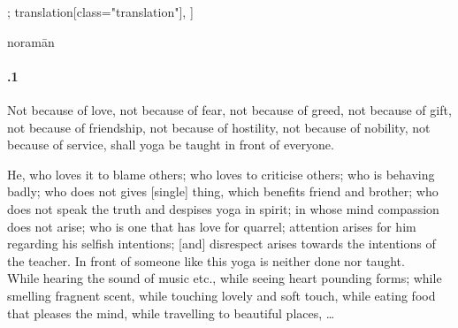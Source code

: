 \begin{alignment}[
  texts=edition[class="edition"];
  translation[class="translation"],
  ]
\begin{edition}
\begin{prose}
{  
}noramān\dd{}
    \end{prose}
  \end{edition}
  \begin{translation}
    \begin{tlate}
      \paragraph{.1 } Not because of love, not because of fear, not because of greed, not because of gift, not because of friendship, not because of hostility, not because of nobility, not because of service, shall yoga be taught in front of everyone.
      \bigskip
      
He, who loves it to blame others; who loves to criticise others; who is behaving badly; who does not gives [single] thing, which benefits friend and brother; who does not speak the truth and despises yoga in spirit; in whose mind compassion does not arise; who is one that has love for quarrel; attention arises for him regarding his selfish intentions; [and] disrespect arises towards the intentions of the teacher. In front of someone like this yoga is neither done nor taught.\\

While hearing the sound of music etc., while seeing heart pounding forms; while smelling fragnent scent, while touching lovely and soft touch, while eating food that pleases the mind, while travelling to beautiful places, \ldots
    \end{tlate}
  \end{translation}
\end{alignment}
\pagebreak %
